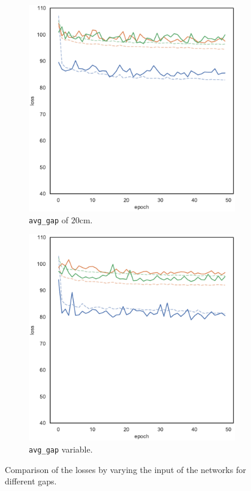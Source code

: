 \begin{figure}[!htb]
\begin{subfigure}[h]{0.3\textwidth}
		\includegraphics[width=\textwidth]{contents/images/task1-extension/loss-distributed-gap_20@copy}%
		\caption{\texttt{avg\_gap} of $20$cm.}
	\end{subfigure}
	\hfill
	\begin{subfigure}[h]{0.3\textwidth}
		\centering
		\includegraphics[width=\textwidth]{contents/images/task1-extension/loss-distributed-gap_var@copy}
		\caption{\texttt{avg\_gap} variable.}
	\end{subfigure}
		\caption[Losses summary of the second set of 
		experiments.]{Comparison of the losses by varying the input of the networks 
		for different gaps.}
	\label{fig:distloss820var}
	\vspace{-0.5cm}
\end{figure}

